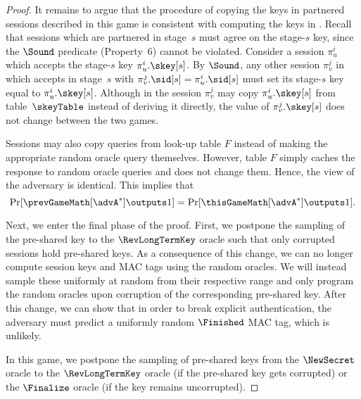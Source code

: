 \begin{proof}
	\medskip
	
	\noindent 
	It remains to argue that the procedure of copying the keys in partnered sessions described in this game is consistent with computing the keys in \prevGameText.
	Recall that sessions which are partnered in stage~$s$ must agree on the stage-$s$ key, since the $\Sound$ predicate (Property~6) cannot be violated.	
	Consider a session $\pi_u^i$ which accepts the stage-$s$ key $\pi_u^i.\skey[s]$. 
	By $\Sound$, any other session $\pi_v^j$ in \prevGameText which accepts in stage~$s$ with $\pi_v^j.\sid[s] = \pi_u^i.\sid[s]$ must set its stage-$s$ key equal to $\pi_u^i.\skey[s]$.
	Although in \thisGame the session $\pi_v^j$ may copy $\pi_u^i.\skey[s]$ from table~$\skeyTable$ instead of deriving it directly, the value of $\pi_v^j.\skey[s]$ does not change between the two games.
	
	Sessions may also copy queries from look-up table $F$ instead of making the appropriate random oracle query themselves.
	However, table $F$ simply caches the response to random oracle queries and does not change them.  
	Hence, the view of the adversary is identical.
	This implies that
	\[ 
		\Pr[ \prevGameMath[\advA^*] \outputs 1 ] = \Pr[ \thisGameMath[\advA^*] \outputs 1 ]. 
	\]

	\bigskip
	\noindent
	Next, we enter the final phase of the proof.
	First, we postpone the sampling of the pre-shared key to the $\RevLongTermKey$ oracle such that only corrupted sessions hold pre-shared keys.
	As a consequence of this change, we can no longer compute session keys and MAC tags using the random oracles.
	We will instead sample these uniformly at random from their respective range and only program the random oracles upon corruption of the corresponding pre-shared key.
	After this change, we can show that in order to break explicit authentication, the adversary must predict a uniformly random $\Finished$ MAC tag, which is unlikely.
	
	In this game, we postpone the sampling of pre-shared keys from the $\NewSecret$ oracle to the $\RevLongTermKey$ oracle (if the pre-shared key gets corrupted) or the $\Finalize$ oracle (if the key remains uncorrupted).
	

\end{proof}
